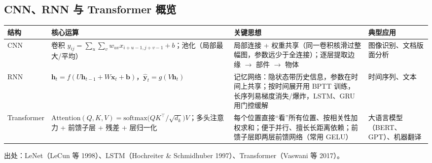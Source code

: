 \subsection{CNN、RNN 与 Transformer 概览}
\noindent\begin{tabularx}{\linewidth}{@{}p{1.7cm}p{4.9cm}Lp{2.2cm}@{}}
\toprule
结构 & 核心运算 & 关键思想 & 典型应用 \\
\midrule
CNN & 卷积 $y_{ij}=\sum_u\sum_vw_{uv}x_{i+u-1,j+v-1}+b$；池化（局部最大/平均） & 局部连接 + 权重共享（同一卷积核滑过整幅图，参数远少于全连接）；逐层提取边缘 $\to$ 部件 $\to$ 物体 & 图像识别、文档版面分析 \\
RNN & $\bm h_t=f(U\bm h_{t-1}+W\bm x_t+\bm b)$，$\hat{\bm y}_t=g(V\bm h_t)$ & 记忆网络：隐状态带历史信息，参数在时间上共享；按时间展开用 BPTT 训练，长序列易梯度消失/爆炸，LSTM、GRU 用门控缓解 & 时间序列、文本 \\
Transformer & $\mathrm{Attention}(Q,K,V)=\mathrm{softmax}\big(QK^\top/\sqrt{d_k}\big)V$；多头注意力 + 前馈子层 + 残差 + 层归一化 & 每个位置直接“看”所有位置、按相关性加权求和；便于并行、擅长长距离依赖；前馈子层即两层前馈网络（常用 GELU） & 大语言模型（BERT、GPT）、机器翻译 \\
\bottomrule
\end{tabularx}

\noindent 出处：LeNet（LeCun 等 1998）、LSTM（Hochreiter \& Schmidhuber 1997）、Transformer（Vaswani 等 2017）。

